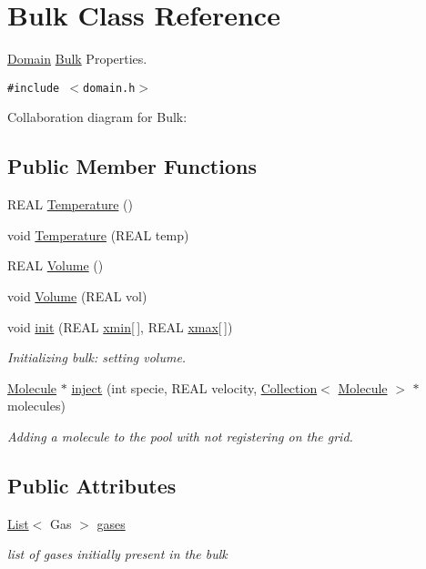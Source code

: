 \hypertarget{classBulk}{
\section{Bulk Class Reference}
\label{classBulk}
}
\hyperlink{classDomain}{Domain} \hyperlink{classBulk}{Bulk} Properties.  


{\tt \#include $<$domain.h$>$}

Collaboration diagram for Bulk:\subsection*{Public Member Functions}
\begin{CompactItemize}
\item 
REAL \hyperlink{classBulk_144b86ce82e59e0fc17ff6d3fe137ee2}{Temperature} ()
\item 
void \hyperlink{classBulk_7b569f588bb4e079a23a28a843a05004}{Temperature} (REAL temp)
\item 
REAL \hyperlink{classBulk_8963a26979d5c6b828efeb4ab9705066}{Volume} ()
\item 
void \hyperlink{classBulk_0be4e849c0cc7db4a4d630fc702dfea8}{Volume} (REAL vol)
\item 
void \hyperlink{classBulk_0c85c5e3ec7be306c8f5d09178647b21}{init} (REAL \hyperlink{classBulk_5dadbb8571e0fef63e38bcc26c47637e}{xmin}\mbox{[}$\,$\mbox{]}, REAL \hyperlink{classBulk_3297dbcf83d7c66815a5c713ebf1bfd4}{xmax}\mbox{[}$\,$\mbox{]})
\begin{CompactList}\small\item\em Initializing bulk: setting volume. \item\end{CompactList}\item 
\hyperlink{classMolecule}{Molecule} $\ast$ \hyperlink{classBulk_201f623418ac1056a3b1a34a5a02ed12}{inject} (int specie, REAL velocity, \hyperlink{classCollection}{Collection}$<$ \hyperlink{classMolecule}{Molecule} $>$ $\ast$molecules)
\begin{CompactList}\small\item\em Adding a molecule to the pool with not registering on the grid. \item\end{CompactList}\end{CompactItemize}
\subsection*{Public Attributes}
\begin{CompactItemize}
\item 
\hyperlink{classList}{List}$<$ Gas $>$ \hyperlink{classBulk_fd6da0b732d536d58c95ccda093d8994}{gases}
\begin{CompactList}\small\item\em list of gases initially present in the bulk \item\end{CompactList}\end{CompactItemize}
